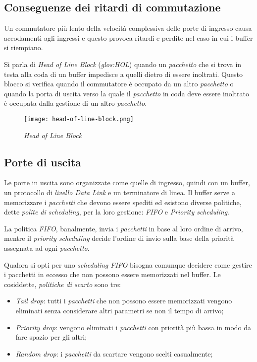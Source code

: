 \subsection{Conseguenze dei ritardi di commutazione}
Un commutatore più lento della velocità complessiva delle porte di ingresso
causa accodamenti agli ingressi e questo provoca ritardi e perdite nel caso
in cui i buffer si riempiano.

Si parla di \emph{Head of Line Block} (\emph{\gls{glos:HOL}}) quando un
\emph{pacchetto} che si trova in testa alla coda di un buffer impedisce a quelli
dietro di essere inoltrati. Questo blocco si verifica quando il commutatore è
occupato da un altro \emph{pacchetto} o quando la porta di uscita verso la quale
il \emph{pacchetto} in coda deve essere inoltrato è occupata dalla gestione di
un altro \emph{pacchetto}.

\begin{figure}[h!]
    \centering
    \texttt{[image: head-of-line-block.png]}
    \caption{\emph{Head of Line Block}}
\end{figure}

\subsection{Porte di uscita}
Le porte in uscita sono organizzate come quelle di ingresso, quindi con un
buffer, un protocollo di \emph{livello Data Link} e un terminatore di linea.
Il buffer serve a memorizzare i \emph{pacchetti} che devono essere spediti ed
esistono diverse politiche, dette \emph{polite di scheduling}, per la loro
gestione: \emph{FIFO} e \emph{Priority scheduling}.

La politica \emph{FIFO}, banalmente, invia i \emph{pacchetti} in base al loro
ordine di arrivo, mentre il \emph{priority scheduling} decide l'ordine di
invio sulla base della priorità assegnata ad ogni \emph{pacchetto}.

Qualora si opti per uno \emph{scheduling FIFO} bisogna comunque decidere come
gestire i pacchetti in eccesso che non possono essere memorizzati nel buffer.
Le cosiddette, \emph{politiche di scarto} sono tre:
\begin{itemize}
    \item \emph{Tail drop}: tutti i \emph{pacchetti} che non possono essere
    memorizzati vengono eliminati senza considerare altri parametri se non il
    tempo di arrivo;
    \item \emph{Priority drop}: vengono eliminati i \emph{pacchetti} con priorità
    più bassa in modo da fare spazio per gli altri;
    \item \emph{Random drop}: i \emph{pacchetti} da scartare vengono scelti
    casualmente;
\end{itemize}

